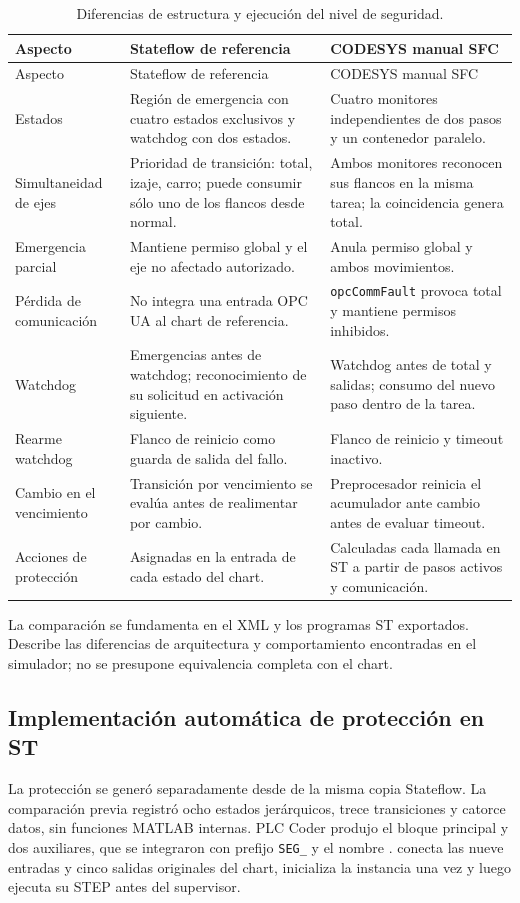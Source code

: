 \documentclass[a4paper,10pt,onecolumn,journal]{ieeeconf}
\numberwithin{equation}{section}
\begin{document}
{\footnotesize
\begin{longtable}{L{3.0cm} L{5.8cm} L{5.8cm}}
\caption{Diferencias de estructura y ejecución del nivel de seguridad.}\label{tab:comparacion_seg_sfc}\\
\toprule Aspecto & Stateflow de referencia & CODESYS manual SFC\\\midrule
\endfirsthead
\toprule Aspecto & Stateflow de referencia & CODESYS manual SFC\\\midrule
\endhead
Estados & Región de emergencia con cuatro estados exclusivos y watchdog con dos estados. & Cuatro monitores independientes de dos pasos y un contenedor paralelo.\\
Simultaneidad de ejes & Prioridad de transición: total, izaje, carro; puede consumir sólo uno de los flancos desde normal. & Ambos monitores reconocen sus flancos en la misma tarea; la coincidencia genera total.\\
Emergencia parcial & Mantiene permiso global y el eje no afectado autorizado. & Anula permiso global y ambos movimientos.\\
Pérdida de comunicación & No integra una entrada OPC UA al chart de referencia. & \texttt{opcCommFault} provoca total y mantiene permisos inhibidos.\\
Watchdog & Emergencias antes de watchdog; reconocimiento de su solicitud en activación siguiente. & Watchdog antes de total y salidas; consumo del nuevo paso dentro de la tarea.\\
Rearme watchdog & Flanco de reinicio como guarda de salida del fallo. & Flanco de reinicio y timeout inactivo.\\
Cambio en el vencimiento & Transición por vencimiento se evalúa antes de realimentar por cambio. & Preprocesador reinicia el acumulador ante cambio antes de evaluar timeout.\\
Acciones de protección & Asignadas en la entrada de cada estado del chart. & Calculadas cada llamada en ST a partir de pasos activos y comunicación.\\
\bottomrule
\end{longtable}}

La comparación se fundamenta en el XML y los programas ST exportados. Describe las diferencias de arquitectura y comportamiento encontradas en el simulador; no se presupone equivalencia completa con el chart.



\subsection{Implementación automática de protección en ST}
La protección se generó separadamente desde  de la misma copia Stateflow. La comparación previa registró ocho estados jerárquicos, trece transiciones y catorce datos, sin funciones MATLAB internas. PLC Coder produjo el bloque principal y dos auxiliares, que se integraron con prefijo \texttt{SEG\_} y el nombre .  conecta las nueve entradas y cinco salidas originales del chart, inicializa la instancia una vez y luego ejecuta su STEP antes del supervisor.
\end{document}
